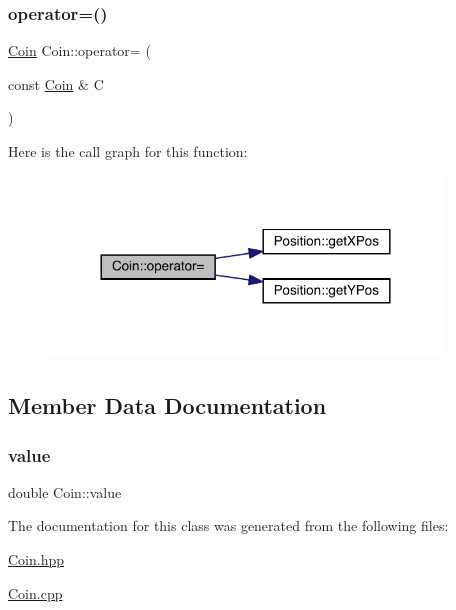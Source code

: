 \subsubsection{\texorpdfstring{operator=()}{operator=()}}
{\footnotesize\ttfamily \mbox{\hyperlink{class_coin}{Coin}} Coin\+::operator= (\begin{DoxyParamCaption}\item[{const \mbox{\hyperlink{class_coin}{Coin}} \&}]{C }\end{DoxyParamCaption})}

Here is the call graph for this function\+:
\nopagebreak
\begin{figure}[H]
\begin{center}
\leavevmode
\includegraphics[width=296pt]{class_coin_adaf4dcbe15a8d4549b4ccdaaca18c9bb_cgraph}
\end{center}
\end{figure}


\subsection{Member Data Documentation}
\mbox{\label{class_coin_ada7dce9fece24cd203828ec6399b7a86}} 
\subsubsection{\texorpdfstring{value}{value}}
{\footnotesize\ttfamily double Coin\+::value\hspace{0.3cm}{\ttfamily [private]}}



The documentation for this class was generated from the following files\+:\begin{DoxyCompactItemize}
\item 
\mbox{\hyperlink{_coin_8hpp}{Coin.\+hpp}}\item 
\mbox{\hyperlink{_coin_8cpp}{Coin.\+cpp}}\end{DoxyCompactItemize}
